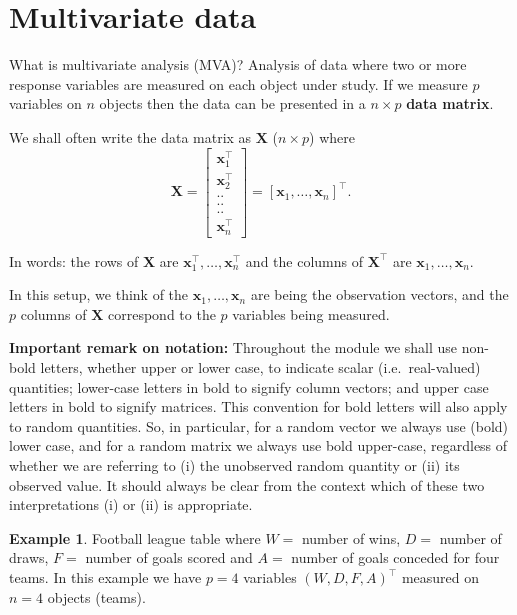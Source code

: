 \documentclass[]{book}
\theoremstyle{definition}
\theoremstyle{definition}
\newtheorem{example}{Example}[chapter]
\theoremstyle{definition}
\theoremstyle{remark}
\begin{document}
\hypertarget{multivariate-data}{%
\section{Multivariate data}\label{multivariate-data}}

What is multivariate analysis (MVA)? Analysis of data where two or more response variables are measured on each object under study. If we measure \(p\) variables on \(n\) objects then the data can be presented in a \(n \times p\) \textbf{data matrix}.

We shall often write the data matrix as \(\mathbf X\) (\(n \times p\)) where
\[
{\mathbf X}=\left[ \begin{array}{c}
\boldsymbol x_1^\top\\
\boldsymbol x_2^\top\\
..\\
..\\
..\\
\boldsymbol x_n^\top
\end{array}\right ]= [ \boldsymbol x_1, \ldots , \boldsymbol x_n]^\top.
\]

In words: the rows of \(\mathbf X\) are \(\boldsymbol x_1^\top, \ldots , \boldsymbol x_n^\top\) and the columns of \(\boldsymbol X^\top\) are
\(\boldsymbol x_1, \ldots , \boldsymbol x_n\).

In this setup, we think of the \(\boldsymbol x_1, \ldots , \boldsymbol x_n\) are being the observation vectors, and the \(p\) columns of \(\mathbf X\)
correspond to the \(p\) variables being measured.

\textbf{Important remark on notation:} Throughout the module we shall use non-bold letters, whether upper or lower case, to indicate scalar (i.e.~real-valued) quantities; lower-case letters in bold to signify column vectors; and upper case letters in bold to signify matrices. This convention for bold letters will also apply to random quantities. So, in particular, for a random vector we always use (bold) lower case, and for a random matrix we always use bold upper-case, regardless of whether we are referring to (i) the unobserved random quantity or (ii) its observed value. It should always be clear from the context which of these two interpretations (i) or (ii) is appropriate.

\begin{example}
\protect\hypertarget{exm:unnamed-chunk-1}{}{\label{exm:unnamed-chunk-1} }Football league table where \(W =\) number of wins, \(D =\) number of draws, \(F =\) number of goals scored and \(A =\) number of goals conceded for four teams.
In this example we have \(p=4\) variables \((W, D, F, A)^\top\) measured on \(n=4\) objects (teams).
\end{example}
\end{document}
